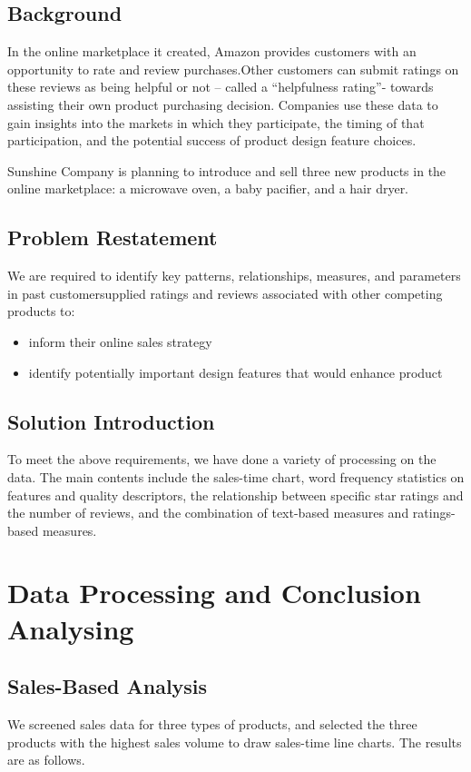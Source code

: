 \documentclass{mcmthesis}
\begin{document}
	\subsection{Background}
	
	In the online marketplace it created, Amazon provides customers with an opportunity to rate and review purchases.Other customers can submit ratings on these reviews as being helpful or not – called a “helpfulness rating”- towards assisting their own product purchasing decision. Companies use these data to gain insights into the markets in which they participate, the timing of that participation, and the potential success of product design feature choices.
	
	Sunshine Company is planning to introduce and sell three new products in the online marketplace: a microwave oven, a baby pacifier, and a hair dryer.
	
	\subsection{Problem Restatement}
	
	We are required to  identify key patterns, relationships, measures, and parameters in past customersupplied ratings and reviews associated with other competing products to:
	\begin{itemize}
		\item 
		inform their online sales strategy
		\item
		identify potentially important design features that would enhance product
	\end{itemize}
	
	\subsection{Solution Introduction}
	
	To meet the above requirements, we have done a variety of processing on the data. The main contents include the sales-time chart, word frequency statistics on features and quality descriptors, the relationship between specific star ratings and the number of reviews, and the combination of  text-based measures and ratings-based measures.
	
	\section{Data Processing and Conclusion Analysing}
	
	\subsection{Sales-Based Analysis}
	We screened sales data for three types of products, and selected the three products with the highest sales volume to draw sales-time line charts. The results are as follows.
	
\end{document}
